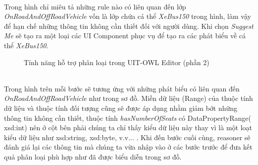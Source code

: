 \\
Trong hình chỉ miêu tả những rule nào có liên quan đến lớp \textit{OnRoadAndOffRoadVehicle} vốn là lớp chứa cá thể \textit{XeBus150} trong hình, làm vậy để hạn chế những thông tin không cần thiết đối với người dùng. Khi chọn \textit{Suggest Me} sẽ tạo ra một loại các UI Component phục vụ để tạo ra các phát biểu về cá thể \textit{XeBus150}.
\begin{figure}[h!]
	\centering
	\caption{Tính năng hỗ trợ phân loại trong UIT-OWL Editor (phần 2)\label{overflow}}
\end{figure}
\\
Trong hình trên mỗi bước sẽ tương ứng với những phát biểu có liên quan đến \textit{OnRoadAndOffRoadVehicle} như trong sơ đồ. Miền dữ liệu (Range) của thuộc tính dữ liệu và thuộc tính đối tượng cũng sẽ được áp dụng nhằm giảm bớt những thông tin không cần thiết, thuộc tính \textit{hasNumberOfSeats} có DataPropertyRange( xsd:int) nên ở cột bên phải chúng ta chỉ thấy kiểu dữ liệu này thay vì là một loạt kiểu dữ liệu như xsd:string, xsd:byte, v.v... . Khi đến bước cuối cùng, reasoner sẽ đánh giá lại các thông tin mà chúng ta vừa nhập vào ở các bước trước để đưa kết quả phân loại phù hợp như đã được biểu diễn trong sơ đồ.
